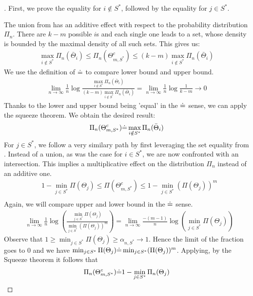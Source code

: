 \begin{proof}[]
  First, we prove the equality for $i \notin S^*$, followed by the equality for $j \in S^*$.

  The union from  has an additive effect with respect to the probability distribution $\Pi_n$. There are $k-m$ possible $i$s and each single one leads to a set, whose density is bounded by the maximal density of all such sets. This gives us:
  \begin{align}
    \max_{i \notin S^*} \Pi_n(\bar{\Theta}_i) \leq \Pi_n(\Theta_{m, S^*}^c) \leq (k-m) \max_{i \notin S^*} \Pi_n(\bar{\Theta}_i)
  \end{align}
  We use the definition of $\dot{=}$ to compare lower bound and upper bound.
  \begin{align}
    \lim_{n \rightarrow \infty} \frac{1}{n} \log{\frac{\max_{i \notin S^*} \Pi_n(\bar{\Theta}_i)}{(k-m)\max_{i \notin S^*} \Pi_n(\bar{\Theta}_i)}}
    = \lim_{n \rightarrow \infty} \frac{1}{n} \log{\frac{1}{k-m}} \rightarrow 0
  \end{align}
  Thanks to the lower and upper bound being 'equal' in the $\dot{=}$ sense, we can apply the squeeze theorem. We obtain the desired result:
  \begin{align}
    \Pi_n(\Theta_{m, S^*}^c) \dot{=} \max_{i \notin S^*} \Pi_n(\bar{\Theta}_i)
  \end{align}
  For $j \in S^*$, we follow a very similary path by first leveraging the set equality from . Instead of a union, as was the case for $i \in S^*$, we are now confronted with an intersection. This implies a multiplicative effect on the distribution $\Pi_n$ instead of an additive one.
  \begin{align}
    &1 - \min_{j \in S^*} \Pi(\Theta_j) \leq \Pi(\Theta_{m, S^*}^c) \leq 1 - \min_{j \in S^*} (\Pi(\Theta_j))^m \\
  \end{align}
  Again, we will compare upper and lower bound in the $\dot{=}$ sense.
  \begin{align}
    &\lim_{n \rightarrow \infty} \frac{1}{n} \log(\frac{\min_{j \in S^*} \Pi(\Theta_j)}{\min_{j \in S^*} (\Pi(\Theta_j))^m}) = \lim_{n \rightarrow \infty} \frac{-(m - 1)}{n} \log(\min_{j \in S^*} \Pi(\Theta_j))
  \end{align}
  Observe that $1 \geq \min_{j \in S^*} \Pi(\Theta_j) \geq \alpha_{n, S^*} \rightarrow 1$. Hence the limit of the fraction goes to 0 and we have $\min_{j \in S^*} \Pi(\Theta_j) \dot{=} \min_{j \in S^*} (\Pi(\Theta_j))^m$. Applying, by the Squeeze theorem it follows that
  \begin{align}
    \Pi_n(\Theta_{m, S^*}^c) \dot{=} 1 - \min_{j \in S^*} \Pi_n(\Theta_j)
  \end{align}
\end{proof}

